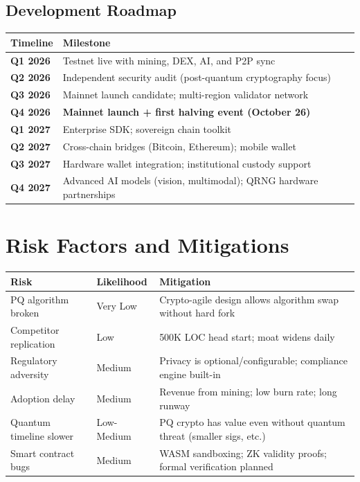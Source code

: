 \documentclass[11pt,a4paper]{article}
\begin{document}
\subsection{Development Roadmap}

\begin{center}
\begin{tabular}{@{}p{2.5cm}p{11.5cm}@{}}
\toprule
\textbf{Timeline} & \textbf{Milestone} \\
\midrule
\textbf{Q1 2026} & Testnet live with mining, DEX, AI, and P2P sync \\
\textbf{Q2 2026} & Independent security audit (post-quantum cryptography focus) \\
\textbf{Q3 2026} & Mainnet launch candidate; multi-region validator network \\
\textbf{Q4 2026} & \textbf{Mainnet launch + first halving event (October 26)} \\
\textbf{Q1 2027} & Enterprise SDK; sovereign chain toolkit \\
\textbf{Q2 2027} & Cross-chain bridges (Bitcoin, Ethereum); mobile wallet \\
\textbf{Q3 2027} & Hardware wallet integration; institutional custody support \\
\textbf{Q4 2027} & Advanced AI models (vision, multimodal); QRNG hardware partnerships \\
\bottomrule
\end{tabular}
\end{center}


\section{Risk Factors and Mitigations}

\begin{center}
\begin{tabular}{@{}p{4cm}p{3cm}p{7cm}@{}}
\toprule
\textbf{Risk} & \textbf{Likelihood} & \textbf{Mitigation} \\
\midrule
PQ algorithm broken & Very Low & Crypto-agile design allows algorithm swap without hard fork \\
Competitor replication & Low & 500K LOC head start; moat widens daily \\
Regulatory adversity & Medium & Privacy is optional/configurable; compliance engine built-in \\
Adoption delay & Medium & Revenue from mining; low burn rate; long runway \\
Quantum timeline slower & Low-Medium & PQ crypto has value even without quantum threat (smaller sigs, etc.) \\
Smart contract bugs & Medium & WASM sandboxing; ZK validity proofs; formal verification planned \\
\bottomrule
\end{tabular}
\end{center}
\end{document}
